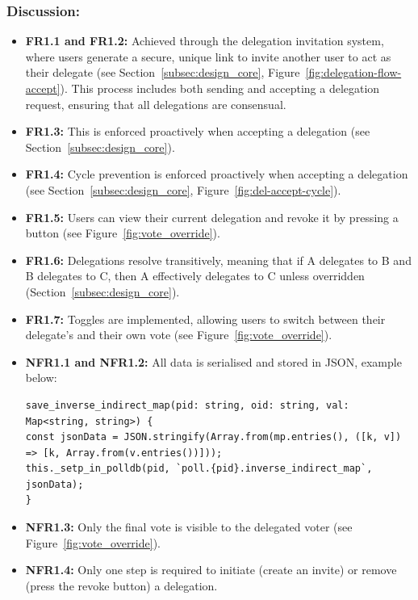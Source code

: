 \subsubsection{Discussion:}

\begin{itemize}
    \item \textbf{FR1.1 and FR1.2:} Achieved through the delegation invitation system, where users generate a secure, unique link to invite another user to act as their delegate (see Section~\ref{subsec:design_core}, Figure~\ref{fig:delegation-flow-accept}). This process includes both sending and accepting a delegation request, ensuring that all delegations are consensual.
    \item \textbf{FR1.3:} This is enforced proactively when accepting a delegation (see Section~\ref{subsec:design_core}).
    \item \textbf{FR1.4:} Cycle prevention is enforced proactively when accepting a delegation (see Section~\ref{subsec:design_core}, Figure~\ref{fig:del-accept-cycle}).
    \item \textbf{FR1.5:} Users can view their current delegation and revoke it by pressing a button (see Figure~\ref{fig:vote_override}).
    \item \textbf{FR1.6:} Delegations resolve transitively, meaning that if A delegates to B and B delegates to C, then A effectively delegates to C unless overridden (Section~\ref{subsec:design_core}).
    \item \textbf{FR1.7:} Toggles are implemented, allowing users to switch between their delegate's and their own vote (see Figure~\ref{fig:vote_override}).
    \item \textbf{NFR1.1 and NFR1.2:} All data is serialised and stored in JSON, example below:
\begin{verbatim}
save_inverse_indirect_map(pid: string, oid: string, val: Map<string, string>) {
const jsonData = JSON.stringify(Array.from(mp.entries(), ([k, v]) => [k, Array.from(v.entries())]));
this._setp_in_polldb(pid, `poll.{pid}.inverse_indirect_map`, jsonData);
}
\end{verbatim}
    \item \textbf{NFR1.3:} Only the final vote is visible to the delegated voter (see Figure~\ref{fig:vote_override}).
    \item \textbf{NFR1.4:} Only one step is required to initiate (create an invite) or remove (press the revoke button) a delegation.
\end{itemize}

